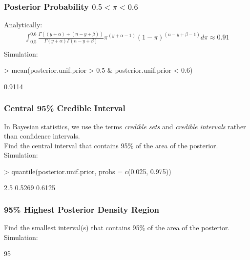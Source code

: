 \documentclass{beamer}
\begin{document}
\begin{frame}[fragile]
\frametitle{Posterior Probability $0.5 < \pi < 0.6$}
\pause
Analytically:
\begin{eqnarray*}
\int_{0.5}^{0.6}  \frac{\Gamma ((y+\alpha) + (n-y+\beta))}{\Gamma (y+\alpha)
\Gamma (n-y+\beta)} \pi^{(y+\alpha - 1)} (1 - \pi)^{(n-y+\beta-1)}
d\pi \approx 0.91\\
\end{eqnarray*}
\pause
\bigskip
Simulation:
\tiny
\begin{Schunk}
\begin{Sinput}
> mean(posterior.unif.prior > 0.5 & posterior.unif.prior < 0.6)
\end{Sinput}
\begin{Soutput}
[1] 0.9114
\end{Soutput}
\end{Schunk}
\end{frame}

\begin{frame}[fragile]
\frametitle{Central 95\% Credible Interval}
\pause
In Bayesian statistics, we use the terms \textit{credible sets} and
\textit{credible intervals} rather than confidence intervals.\\
\bigskip
\pause
Find the central interval that contains 95\% of the area of the
posterior. \\
\bigskip
\pause
\bigskip
Simulation:
\bigskip
\tiny
\begin{Schunk}
\begin{Sinput}
> quantile(posterior.unif.prior, probs = c(0.025, 0.975))
\end{Sinput}
\begin{Soutput}
  2.5%
0.5269 0.6125 
\end{Soutput}
\end{Schunk}
\normalsize
\end{frame}


\begin{frame}[fragile]
\frametitle{95\% Highest Posterior Density Region}
\pause
Find the smallest interval(s) that contains 95\% of the area of the
posterior. \\
\bigskip
\pause
\bigskip
Simulation:
\bigskip
\tiny
\begin{Schunk}
\begin{Soutput}
      [,1]   [,2]
95%
\end{Soutput}
\end{Schunk}
\normalsize
\end{frame}
\end{document}
